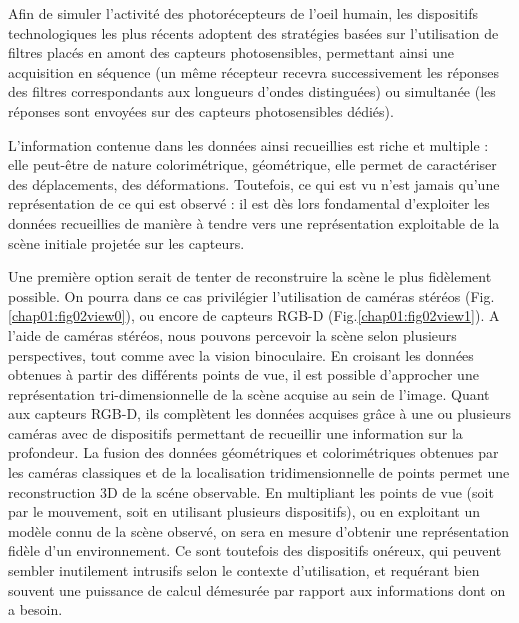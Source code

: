 Afin de simuler l'activité des photorécepteurs de l'oeil humain, les 
dispositifs technologiques les plus récents adoptent des stratégies basées sur 
l'utilisation de filtres placés en amont des capteurs photosensibles, 
permettant 
ainsi une acquisition en séquence (un même récepteur recevra successivement les 
réponses des filtres correspondants aux longueurs d'ondes distinguées) ou 
simultanée (les réponses sont envoyées sur des capteurs photosensibles dédiés).
  
L'information contenue dans les données ainsi recueillies est riche et multiple 
: elle peut-être de nature colorimétrique, géométrique, elle permet de 
ca\-ractériser des déplacements, des déformations. Toutefois, ce qui est vu 
n'est jamais qu'une représentation de ce qui est observé : il est d\`es lors 
fondamental d'exploiter les donn\'ees recueillies de mani\`ere \`a tendre 
vers une repr\'esentation exploitable de la scène initiale projetée sur les 
capteurs.

Une premi\`ere option serait de tenter de reconstruire la sc\`ene le plus 
fid\`element possible. On pourra dans ce cas privil\'egier l'utilisation de 
cam\'eras st\'er\'eos (Fig.\ref{chap01:fig02view0})\cite{brandou2006}, ou 
encore de capteurs RGB-D (Fig.\ref{chap01:fig02view1})\cite{siradjuddin2012}. A 
l'aide de cam\'eras st\'er\'eos, nous pouvons percevoir la sc\`ene selon 
plusieurs perspectives, tout comme avec la vision binoculaire. En croisant les 
donn\'ees obtenues \`a partir des diff\'erents points de vue, il est possible 
d'approcher une repr\'esentation tri-dimensionnelle de la sc\`ene acquise au 
sein de l'image. Quant aux capteurs RGB-D, ils compl\`etent les donn\'ees 
acquises gr\^ace \`a une ou plusieurs cam\'eras avec de dispositifs permettant 
de recueillir une information sur la profondeur. La fusion des donn\'ees 
g\'eom\'etriques et colorim\'etriques obtenues par les cam\'eras classiques et 
de la localisation tridimensionnelle de points permet une reconstruction 3D de 
la sc\'ene observable. En multipliant les points de vue (soit par le mouvement, 
soit en utilisant plusieurs dispositifs), ou en exploitant un mod\`ele connu de 
la sc\`ene observ\'e, on sera en mesure d'obtenir une repr\'esentation fid\`ele 
d'un environnement. Ce sont toutefois des dispositifs on\'ereux, qui peuvent 
sembler inutilement intrusifs selon le contexte d'utilisation, et requ\'erant 
bien souvent une puissance de calcul d\'emesur\'ee par rapport aux informations 
dont on a besoin.

